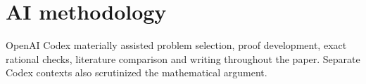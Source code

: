 \documentclass[acmsmall,screen,nonacm,11pt]{acmart}
\begin{document}
\section*{AI methodology}
OpenAI Codex materially assisted problem selection, proof development, exact rational checks, literature comparison and writing throughout the paper. Separate Codex contexts also scrutinized the mathematical argument.


\end{document}
